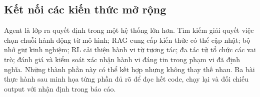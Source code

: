 \subsection{Kết nối các kiến thức mở rộng}
Agent là lớp ra quyết định trong một hệ thống lớn hơn. Tìm kiếm giải quyết việc chọn
chuỗi hành động từ mô hình; RAG cung cấp kiến thức có thể cập nhật; bộ nhớ giữ kinh
nghiệm; RL cải thiện hành vi từ tương tác; đa tác tử tổ chức các vai trò; đánh giá và
kiểm soát xác nhận hành vi đáng tin trong phạm vi đã định nghĩa. Những thành phần này
có thể kết hợp nhưng không thay thế nhau. Ba bài thực hành sau minh họa từng phần đủ
rõ để đọc hết code, chạy lại và đối chiếu output với nhận định trong báo cáo.
